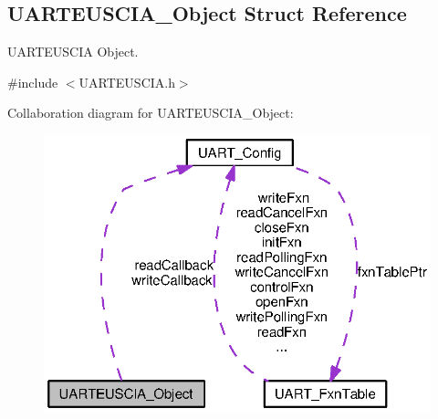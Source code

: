 \subsection{U\-A\-R\-T\-E\-U\-S\-C\-I\-A\-\_\-\-Object Struct Reference}
\label{struct_u_a_r_t_e_u_s_c_i_a___object}


U\-A\-R\-T\-E\-U\-S\-C\-I\-A Object.  




{\ttfamily \#include $<$U\-A\-R\-T\-E\-U\-S\-C\-I\-A.\-h$>$}



Collaboration diagram for U\-A\-R\-T\-E\-U\-S\-C\-I\-A\-\_\-\-Object\-:
\nopagebreak
\begin{figure}[H]
\begin{center}
\leavevmode
\includegraphics[width=322pt]{struct_u_a_r_t_e_u_s_c_i_a___object__coll__graph}
\end{center}
\end{figure}
